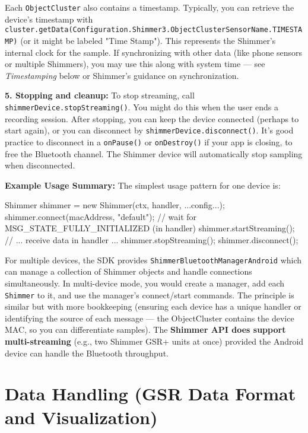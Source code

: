 {{Each \texttt{ObjectCluster} also contains a timestamp. Typically, you can
retrieve the device's timestamp with
\texttt{cluster.getData(Configuration.Shimmer3.ObjectClusterSensorName.TIMESTAMP)}
(or it might be labeled "Time Stamp"). This represents the Shimmer's
internal clock for the
sample\cite{ref23}\cite{ref24}.
If synchronizing with other data (like phone sensors or multiple
Shimmers), you may use this along with system time --- see \textit{Timestamping}
below or Shimmer's guidance on synchronization.

\textbf{5. Stopping and cleanup:} To stop streaming, call
\texttt{shimmerDevice.stopStreaming()}. You might do this when the user ends a
recording session. After stopping, you can keep the device connected
(perhaps to start again), or you can disconnect by
\texttt{shimmerDevice.disconnect()}. It's good practice to disconnect in a
\texttt{onPause()} or \texttt{onDestroy()} if your app is closing, to free the
Bluetooth channel. The Shimmer device will automatically stop sampling
when disconnected.

\textbf{Example Usage Summary:} The simplest usage pattern for one device is:

    Shimmer shimmer = new Shimmer(ctx, handler, ...config...);
    shimmer.connect(macAddress, "default");
    // wait for MSG_STATE_FULLY_INITIALIZED (in handler)
    shimmer.startStreaming();
    // ... receive data in handler ...
    shimmer.stopStreaming();
    shimmer.disconnect();

For multiple devices, the SDK provides \texttt{ShimmerBluetoothManagerAndroid}
which can manage a collection of Shimmer objects and handle connections
simultaneously. In multi-device mode, you would create a manager, add
each \texttt{Shimmer} to it, and use the manager's connect/start commands. The
principle is similar but with more bookkeeping (ensuring each device has
a unique handler or identifying the source of each message --- the
ObjectCluster contains the device MAC, so you can differentiate
samples\cite{ref25}).
The \textbf{Shimmer API does support multi-streaming} (e.g., two Shimmer GSR+
units at once) provided the Android device can handle the Bluetooth
throughput\cite{ref26}\cite{ref27}.

\section{Data Handling (GSR Data Format and Visualization)}

}}
